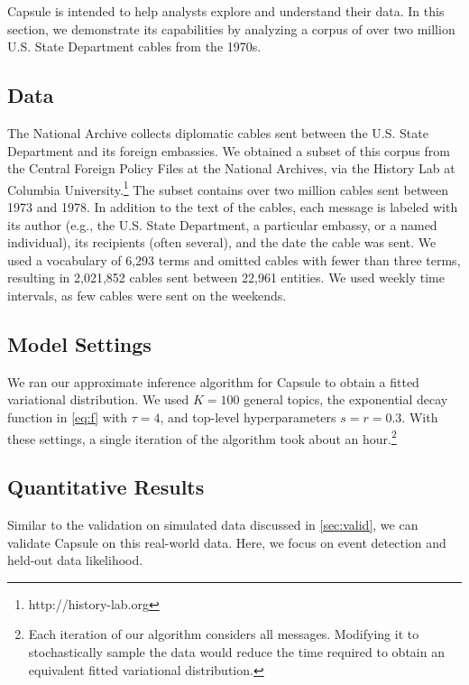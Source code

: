 Capsule is intended to help analysts explore and understand their
data. In this section, we demonstrate its capabilities by analyzing a
corpus of over two million U.S. State Department cables from the
1970s.

\subsection{Data}

The National Archive collects diplomatic cables sent between the
U.S. State Department and its foreign embassies. We obtained a subset
of this corpus from the Central Foreign Policy Files at the National
Archives, via the History Lab at Columbia
University.\footnote{http://history-lab.org} The subset contains over
two million cables sent between 1973 and 1978. In addition to the text
of the cables, each message is labeled with its author (e.g., the
U.S. State Department, a particular embassy, or a named individual),
its recipients (often several), and the date the cable was sent. We
used a vocabulary of 6,293 terms and omitted cables with fewer than
three terms, resulting in 2,021,852 cables sent between 22,961
entities. We used weekly time intervals, as few cables were sent on
the weekends.

\subsection{Model Settings}


We ran our approximate inference algorithm for Capsule to obtain a
fitted variational distribution. We used $K=100$ general topics, the
exponential decay function in \cref{eq:f} with $\tau=4$, and top-level
hyperparameters $s=r=0.3$. With these settings, a single iteration of
the algorithm took about an hour.\footnote{Each iteration of our
  algorithm considers all messages. Modifying it to stochastically
  sample the data would reduce the time required to obtain an
  equivalent fitted variational distribution.}

\subsection{Quantitative Results}

Similar to the validation on simulated data discussed in \cref{sec:valid},
we can validate Capsule on this real-world data.  Here, we focus on event detection
and held-out data likelihood.

